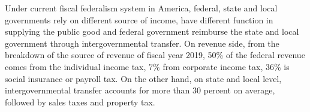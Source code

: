 Under current fiscal federalism system in America, federal, state and local governments rely on different source of income, have different function in supplying the public good and federal government reimburse the state and local government through intergovernmental transfer. On revenue side, from the breakdown of the source of revenue of fiscal year 2019, 50\% of the federal revenue comes from the individual income tax, 7\% from corporate income tax, 36\% is social insurance or payroll tax. On the other hand, on state and local level, intergovernmental transfer accounts for more than 30 percent on average, followed by sales taxes and property tax.
\begin{figure}[H]
    \centering  %
\end{figure}
